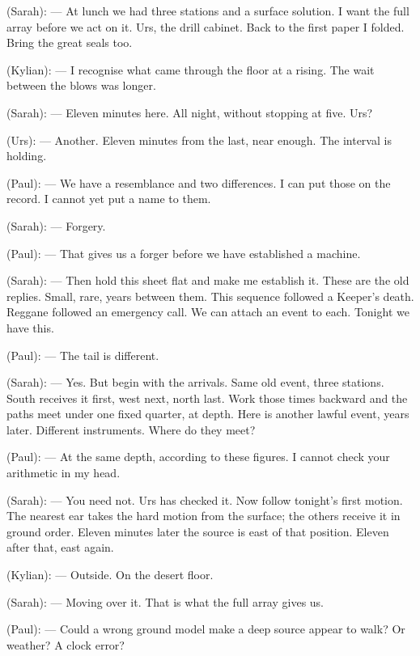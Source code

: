 
\begin{room}

(Sarah): --- At lunch we had three stations and a surface solution. I want the full array before we act on it. Urs, the drill cabinet. Back to the first paper I folded. Bring the great seals too.

(Kylian): --- I recognise what came through the floor at a rising. The wait between the blows was longer.

(Sarah): --- Eleven minutes here. All night, without stopping at five. Urs?

(Urs): --- Another. Eleven minutes from the last, near enough. The interval is holding.

(Paul): --- We have a resemblance and two differences. I can put those on the record. I cannot yet put a name to them.

(Sarah): --- Forgery.

(Paul): --- That gives us a forger before we have established a machine.

(Sarah): --- Then hold this sheet flat and make me establish it. These are the old replies. Small, rare, years between them. This sequence followed a Keeper's death. Reggane followed an emergency call. We can attach an event to each. Tonight we have this.

(Paul): --- The tail is different.

(Sarah): --- Yes. But begin with the arrivals. Same old event, three stations. South receives it first, west next, north last. Work those times backward and the paths meet under one fixed quarter, at depth. Here is another lawful event, years later. Different instruments. Where do they meet?

(Paul): --- At the same depth, according to these figures. I cannot check your arithmetic in my head.

(Sarah): --- You need not. Urs has checked it. Now follow tonight's first motion. The nearest ear takes the hard motion from the surface; the others receive it in ground order. Eleven minutes later the source is east of that position. Eleven after that, east again.

(Kylian): --- Outside. On the desert floor.

(Sarah): --- Moving over it. That is what the full array gives us.

(Paul): --- Could a wrong ground model make a deep source appear to walk? Or weather? A clock error?


\end{room}
